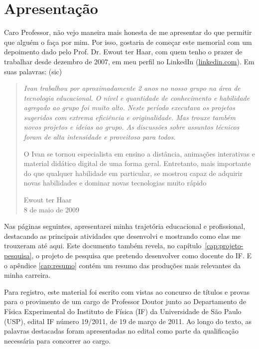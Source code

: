 \chapter{Apresentação}

Caro Professor, não vejo maneira mais honesta de me apresentar do que permitir que alguém o faça por mim. Por isso, gostaria de começar este memorial com um depoimento dado pelo Prof. Dr. Ewout ter Haar, com quem tenho o prazer de trabalhar desde dezembro de 2007, em meu perfil no LinkedIn (\url{linkedin.com}). Em suas palavras: (sic)

\begin{quotation}

{\itshape Ivan trabalhou por aproximadamente 2 anos no nosso grupo na área de tecnologia educacional. O nível e quantidade de conhecimento e habilidade agregado ao grupo foi muito alto. Neste período executava os projetos sugeridos com extrema eficiência e originalidade. Mas trouxe também novos projetos e ideias ao grupo. As discussões sobre assuntos técnicos foram de alta intensidade e proveitoso para todos. 

O Ivan se tornou especialista em ensino a distância, animações interativas e material didático digital de uma forma geral. Entretanto, mais importante do que qualquer habilidade em particular, se mostrou capaz de adquirir novas habilidades e dominar novas tecnologias muito rápido}

\begin{flushright}
Ewout ter Haar\\8 de maio de 2009
\end{flushright}

\end{quotation}

Nas páginas seguintes, apresentarei minha trajetória educacional e profissional, destacando as principais atividades que desenvolvi e mostrando como elas me trouxeram até aqui. Este documento também revela, no capítulo~\ref{cap:projeto-pesquisa}, o projeto de pesquisa que pretendo desenvolver como docente do IF. E o apêndice \ref{cap:resumo} contém um resumo das produções mais relevantes da minha carreira.

Para registro, este material foi escrito com vistas ao concurso de títulos e provas para o provimento de um cargo de Professor Doutor junto ao Departamento de Física Experimental do Instituto de Física (IF) da Universidade de São Paulo (USP), edital IF número 19/2011, de 19 de março de 2011. Ao longo do texto, as palavras destacadas  foram apresentadas no edital como parte da qualificação necessária para concorrer ao cargo.

